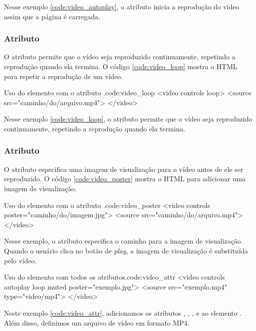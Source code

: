 Nesse exemplo \ref{code:video_autoplay}, o atributo  inicia a reprodução do vídeo assim que a página é carregada.

\subsubsection{Atributo }

O atributo  permite que o vídeo seja reproduzido continuamente, repetindo a reprodução quando ela termina. O código \ref{code:video_loop} mostra o HTML para repetir a reprodução de um vídeo.

\begin{htmlcode}{Uso do elemento  com o atributo .}{code:video_loop}
<video controls loop>
  <source src="caminho/do/arquivo.mp4">
</video>
\end{htmlcode}

Nesse exemplo \ref{code:video_loop}, o atributo  permite que o vídeo seja reproduzido continuamente, repetindo a reprodução quando ela termina.

\subsubsection{Atributo }

O atributo  especifica uma imagem de visualização para o vídeo antes de ele ser reproduzido. O código \ref{code:video_poster} mostra o HTML para adicionar uma imagem de visualização.

\begin{htmlcode}{Uso do elemento  com o atributo .}{code:video_poster}
<video controls poster="caminho/do/imagem.jpg">
  <source src="caminho/do/arquivo.mp4">
</video>
\end{htmlcode}

Nesse exemplo, o atributo  especifica o caminho para a imagem de visualização. Quando o usuário clica no botão de \textit{play}, a imagem de visualização é substituída pelo vídeo.

\begin{htmlcode}{Uso do elemento  com todos os atributos.}{code:video_attr}
<video controls autoplay loop muted poster="exemplo.jpg">
  <source src="exemplo.mp4" type="video/mp4">
</video>
\end{htmlcode}

Neste exemplo \ref{code:video_attr}, adicionamos os atributos , , ,  e  ao elemento . Além disso, definimos um arquivo de vídeo em formato MP4.

